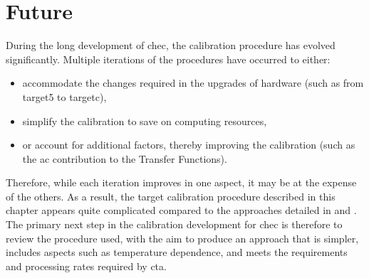 \section{Future}

During the long development of \gls{chec}, the calibration procedure has evolved significantly. Multiple iterations of the procedures have occurred to either:
\begin{itemize}
	\item accommodate the changes required in the upgrades of hardware (such as from \gls{target5} to \gls{targetc}),
	\item simplify the calibration to save on computing resources,
	\item or account for additional factors, thereby improving the calibration (such as the \gls{ac} contribution to the Transfer Functions).
\end{itemize}
Therefore, while each iteration improves in one aspect, it may be at the expense of the others. As a result, the \gls{target} calibration procedure described in this chapter appears quite complicated compared to the approaches detailed in \cite{Albert2017} and \cite{Bechtol2012}. The primary next step in the calibration development for \gls{chec} is therefore to review the procedure used, with the aim to produce an approach that is simpler, includes aspects such as temperature dependence, and meets the requirements and processing rates required by \gls{cta}.
